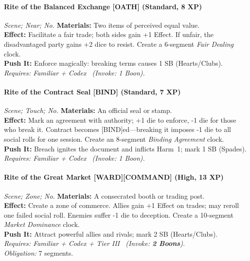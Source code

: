 \paragraph{Rite of the Balanced Exchange \textnormal{[OATH]} (Standard, 8 XP)} \emph{Scene; Near; No.}
\textbf{Materials:} Two items of perceived equal value.\\
\textbf{Effect:} Facilitate a fair trade; both sides gain +1 Effect. If unfair, the disadvantaged party gains +2 dice to resist. Create a 6-segment \emph{Fair Dealing} clock.\\
\textbf{Push It:} Enforce magically: breaking terms causes 1 SB (Hearts/Clubs).\\
\emph{Requires: Familiar + Codex \ (\textit{Invoke:} 1 Boon).}

\paragraph{Rite of the Contract Seal \textnormal{[BIND]} (Standard, 7 XP)} \emph{Scene; Touch; No.}
\textbf{Materials:} An official seal or stamp.\\
\textbf{Effect:} Mark an agreement with authority; +1 die to enforce, -1 die for those who break it. Contract becomes [BIND]ed—breaking it imposes -1 die to all social rolls for one session. Create an 8-segment \emph{Binding Agreement} clock.\\
\textbf{Push It:} Breach ignites the document and inflicts Harm~1; mark 1 SB (Spades).\\
\emph{Requires: Familiar + Codex \ (\textit{Invoke:} 1 Boon).}

\paragraph{Rite of the Great Market \textnormal{[WARD][COMMAND]} (High, 13 XP)} \emph{Scene; Zone; No.}
\textbf{Materials:} A consecrated booth or trading post.\\
\textbf{Effect:} Create a zone of commerce. Allies gain +1 Effect on trades; may reroll one failed social roll. Enemies suffer -1 die to deception. Create a 10-segment \emph{Market Dominance} clock.\\
\textbf{Push It:} Attract powerful allies and rivals; mark 2 SB (Hearts/Clubs).\\
\emph{Requires: Familiar + Codex + Tier III \ (\textit{Invoke:} \textbf{2 Boons}).}\\
\emph{Obligation:} 7 segments.

